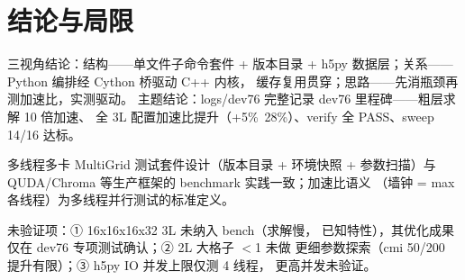 \documentclass[UTF8]{ctexart}
\begin{document}
\section{结论与局限}
\begin{conclbox}
三视角结论：\textcolor{struct}{结构}——单文件子命令套件 + 版本目录 + h5py
数据层；\textcolor{relation}{关系}——Python 编排经 Cython 桥驱动 C++ 内核，
缓存复用贯穿；\textcolor{idea}{思路}——先消瓶颈再测加速比，实测驱动。
主题结论：logs/dev76 完整记录 dev76 里程碑——粗层求解 10 倍加速、
全 3L 配置加速比提升（+5\%~28\%）、verify 全 PASS、sweep 14/16 达标。
\end{conclbox}
\begin{refbox}
多线程多卡 MultiGrid 测试套件设计（版本目录 + 环境快照 + 参数扫描）与
QUDA/Chroma 等生产框架的 benchmark 实践一致；加速比语义
（墙钟 = max 各线程）为多线程并行测试的标准定义。
\end{refbox}
\begin{warnbox}
\textcolor{warn}{未验证}项：① 16x16x16x32 3L 未纳入 bench（求解慢，
已知特性），其优化成果仅在 dev76 专项测试确认；② 2L 大格子 $<$1 未做
更细参数探索（cmi 50/200 提升有限）；③ h5py IO 并发上限仅测 4 线程，
更高并发未验证。
\end{warnbox}
\end{document}
